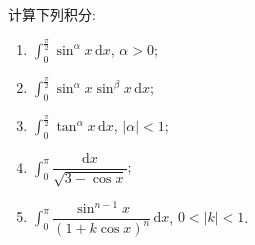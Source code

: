 \begin{example}
    计算下列积分:
    \begin{enumerate}
        \item $\displaystyle\int_0^{\frac{\pi}{2}}\sin^\alpha x\,\mathrm{d}x$, $\alpha>0$;
        \item $\displaystyle\int_0^{\frac{\pi}{2}}\sin^\alpha x\sin^\beta x\,\mathrm{d}x$;
        \item $\displaystyle\int_0^{\frac{\pi}{2}}\tan^\alpha x\,\mathrm{d}x$, $|\alpha|<1$;
        \item $\displaystyle\int_0^\pi\dfrac{\mathrm{d}x}{\sqrt{3-\cos x}}$;
        \item $\displaystyle\int_0^\pi\dfrac{\sin^{n-1}x}{(1+k\cos x)^n}\,\mathrm{d}x$, $0<|k|<1$.
    \end{enumerate}
\end{example}
\exampleblank

